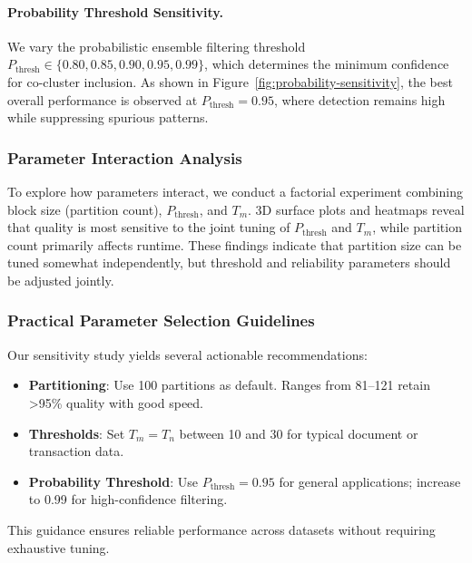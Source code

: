 \documentclass[journal]{IEEEtran}
\begin{document}
{        \paragraph{Probability Threshold Sensitivity.}
        We vary the probabilistic ensemble filtering threshold \( P_{\text{thresh}} \in \{0.80, 0.85, 0.90, 0.95, 0.99\} \), which determines the minimum confidence for co-cluster inclusion. As shown in Figure~\ref{fig:probability-sensitivity}, the best overall performance is observed at \( P_{\text{thresh}} = 0.95 \), where detection remains high while suppressing spurious patterns.

        \subsubsection{Parameter Interaction Analysis}
        To explore how parameters interact, we conduct a factorial experiment combining block size (partition count), \( P_{\text{thresh}} \), and \( T_m \). 3D surface plots and heatmaps reveal that quality is most sensitive to the joint tuning of \( P_{\text{thresh}} \) and \( T_m \), while partition count primarily affects runtime. These findings indicate that partition size can be tuned somewhat independently, but threshold and reliability parameters should be adjusted jointly.

        \subsubsection{Practical Parameter Selection Guidelines}
        Our sensitivity study yields several actionable recommendations:
        \begin{itemize}
            \item \textbf{Partitioning}: Use 100 partitions as default. Ranges from 81–121 retain >95\% quality with good speed.
            \item \textbf{Thresholds}: Set \( T_m = T_n \) between 10 and 30 for typical document or transaction data.
            \item \textbf{Probability Threshold}: Use \( P_{\text{thresh}} = 0.95 \) for general applications; increase to 0.99 for high-confidence filtering.
        \end{itemize}
        This guidance ensures reliable performance across datasets without requiring exhaustive tuning.
    }
\end{document}
